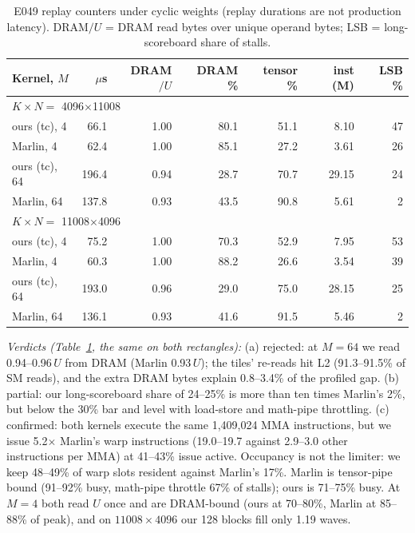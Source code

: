 \documentclass[sigconf,nonacm]{acmart}
\begin{document}
\begin{table}[t]
\caption{E049 replay counters under cyclic weights (replay durations are not production latency). DRAM$/U$ = DRAM read bytes over unique operand bytes; LSB = long-scoreboard share of stalls.}
\label{tab:e049}
\small
\setlength{\tabcolsep}{3pt}
\begin{tabular}{lrrrrrr}
\toprule
Kernel, $M$ & $\mu$s & DRAM$/U$ & DRAM \% & tensor \% & inst (M) & LSB \% \\
\midrule
\multicolumn{7}{l}{$K\times N=$ 4096$\times$11008} \\
ours (tc), 4 & 66.1 & 1.00 & 80.1 & 51.1 & 8.10 & 47 \\
Marlin, 4 & 62.4 & 1.00 & 85.1 & 27.2 & 3.61 & 26 \\
ours (tc), 64 & 196.4 & 0.94 & 28.7 & 70.7 & 29.15 & 24 \\
Marlin, 64 & 137.8 & 0.93 & 43.5 & 90.8 & 5.61 & 2 \\
\multicolumn{7}{l}{$K\times N=$ 11008$\times$4096} \\
ours (tc), 4 & 75.2 & 1.00 & 70.3 & 52.9 & 7.95 & 53 \\
Marlin, 4 & 60.3 & 1.00 & 88.2 & 26.6 & 3.54 & 39 \\
ours (tc), 64 & 193.0 & 0.96 & 29.0 & 75.0 & 28.15 & 25 \\
Marlin, 64 & 136.1 & 0.93 & 41.6 & 91.5 & 5.46 & 2 \\
\bottomrule
\end{tabular}
\end{table}

\emph{Verdicts (Table~\ref{tab:e049}, the same on both rectangles):} (a) rejected: at $M=64$ we read 0.94--0.96\,$U$ from DRAM (Marlin 0.93\,$U$); the tiles' re-reads hit L2 (91.3--91.5\% of SM reads), and the extra DRAM bytes explain 0.8--3.4\% of the profiled gap. (b) partial: our long-scoreboard share of 24--25\% is more than ten times Marlin's 2\%, but below the 30\% bar and level with load-store and math-pipe throttling. (c) confirmed: both kernels execute the same 1,409,024 MMA instructions, but we issue 5.2$\times$ Marlin's warp instructions (19.0--19.7 against 2.9--3.0 other instructions per MMA) at 41--43\% issue active. Occupancy is not the limiter: we keep 48--49\% of warp slots resident against Marlin's 17\%. Marlin is tensor-pipe bound (91--92\% busy, math-pipe throttle 67\% of stalls); ours is 71--75\% busy. At $M=4$ both read $U$ once and are DRAM-bound (ours at 70--80\%, Marlin at 85--88\% of peak), and on $11008\times4096$ our 128 blocks fill only 1.19 waves.
\end{document}
